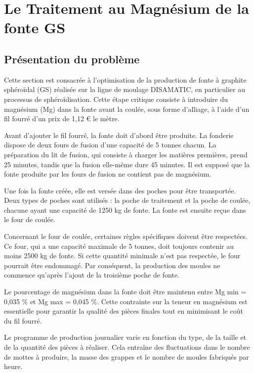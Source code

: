 \documentclass[12pt]{article}
\begin{document}
\section{Le Traitement au Magnésium de la fonte GS}

\subsection{Présentation du problème }



Cette section est consacrée à l'optimisation de la production de fonte à 
graphite sphéroïdal (GS) réalisée sur la ligne de moulage DISAMATIC, en 
particulier au processus de sphéroïdisation. Cette étape critique consiste 
à introduire du magnésium (Mg) dans la fonte avant la coulée, sous forme 
d'alliage, à l'aide d'un fil fourré d'un prix de 1,12 € le mètre.



Avant d'ajouter le fil fourré, la fonte doit d'abord être produite. 
La fonderie dispose de deux fours de fusion d'une capacité de 5 tonnes 
chacun. La préparation du lit de fusion, qui consiste à charger les 
matières premières, prend 25 minutes, tandis que la fusion elle-même 
dure 45 minutes. Il est supposé que la fonte produite par les fours de 
fusion ne contient pas de magnésium.

Une fois la fonte créée, elle est versée dans des poches pour être 
transportée. Deux types de poches sont utilisés : la poche de traitement 
et la poche de coulée, chacune ayant une capacité de 1250 kg de fonte. 
La fonte est ensuite reçue dans le four de coulée.

Concernant le four de coulée, certaines règles spécifiques doivent être 
respectées. Ce four, qui a une capacité maximale de 5 tonnes, doit 
toujours contenir au moins 2500 kg de fonte. Si cette quantité minimale 
n'est pas respectée, le four pourrait être endommagé. Par conséquent, 
la production des moules ne commence qu'après l'ajout de la troisième 
poche de fonte.

Le pourcentage de magnésium dans la fonte doit être maintenu 
entre Mg min = 0,035 \% et Mg max = 0,045 \%. 
Cette contrainte sur la teneur en magnésium 
est essentielle pour garantir la qualité des pièces finales tout en 
minimisant le coût du fil fourré.

Le programme de production journalier varie en fonction du type, de la 
taille et de la quantité des pièces à réaliser. Cela entraîne des 
fluctuations dans le nombre de mottes à produire, la masse des grappes 
et le nombre de moules fabriqués par heure.
\end{document}
